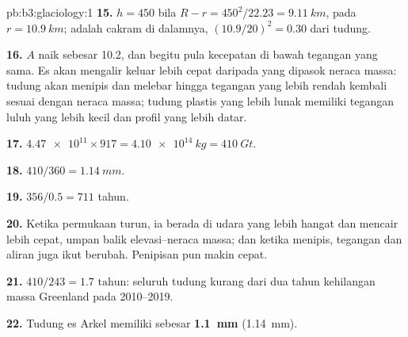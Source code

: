 \begin{solution}{pb:b3:glaciology:1}
\textbf{15.} $h = 450$ bila $R - r = 450^2/22.23 = \qty{9.11}{km}$, pada
$r = \qty{10.9}{km}$;  adalah cakram di dalamnya, $(10.9/
20)^2 = 0.30$ dari tudung.

\textbf{16.} $A$ naik sebesar \num{10.2}, dan begitu pula kecepatan di bawah
tegangan yang sama. Es akan mengalir keluar lebih cepat daripada yang dipasok neraca massa: tudung
akan menipis dan melebar hingga tegangan yang lebih rendah kembali sesuai dengan
neraca massa; tudung plastis yang lebih lunak memiliki tegangan luluh yang lebih kecil dan
profil yang lebih datar.

\textbf{17.} $\num{4.47e11}\times917 = \qty{4.10e14}{kg} = \qty{410}{Gt}$.

\textbf{18.} $410/360 = \qty{1.14}{mm}$.

\textbf{19.} $356/0.5 = 711$ tahun.

\textbf{20.} Ketika permukaan turun, ia berada di udara yang lebih hangat dan mencair lebih cepat,
umpan balik elevasi--neraca massa; dan ketika menipis, tegangan dan
aliran juga ikut berubah. Penipisan pun makin cepat.

\textbf{21.} $410/243 = \num{1.7}\text{ tahun}$: seluruh tudung kurang dari dua
tahun kehilangan massa Greenland pada 2010--2019.

\textbf{22.} Tudung es Arkel memiliki  sebesar
\textbf{\qty[text-series-to-math=true]{1.1}{mm}} (\qty{1.14}{mm}).
\end{solution}
